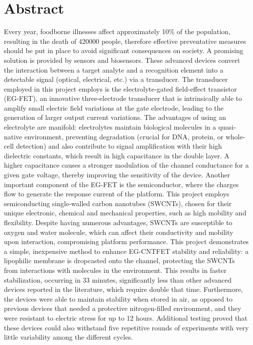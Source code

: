 \chapter*{Abstract}

Every year, foodborne illnesses affect approximately 10\% of the population, resulting in the death of \num{420000} people, therefore effective preventative measures should be put in place to avoid significant consequences on society. A promising solution is provided by sensors and biosensors. These advanced devices convert the interaction between a target analyte and a recognition element into a detectable signal (optical, electrical, etc.) via a transducer. The transducer employed in this project employs is the electrolyte-gated field-effect transistor (EG-FET), an innovative three-electrode transducer that is intrinsically able to amplify small electric field variations at the gate electrode, leading to the generation of larger output current variations. The advantages of using an electrolyte are manifold: electrolytes maintain biological molecules in a quasi-native environment, preventing degradation (crucial for DNA, protein, or whole-cell detection) and also contribute to signal amplification with their high dielectric constants, which result in high capacitance in the double layer. A higher capacitance causes a stronger modulation of the channel conductance for a given gate voltage, thereby improving the sensitivity of the device. Another important component of the EG-FET is the semiconductor, where the charges flow to generate the response current of the platform. This project employs semiconducting single-walled carbon nanotubes (SWCNTs), chosen for their unique electronic, chemical and mechanical properties, such as high mobility and flexibility. Despite having numerous advantages, SWCNTs are susceptible to oxygen and water molecule, which can affect their conductivity and mobility upon interaction, compromising platform performance. This project demonstrates a simple, inexpensive method to enhance EG-CNTFET stability and reliability: a lipophilic membrane is dropcasted onto the channel, protecting the SWCNTs from interactions with molecules in the environment. This results in faster stabilization, occurring in 33 minutes, significantly less than other advanced devices reported in the literature, which require double that time. Furthermore, the devices were able to maintain stability when stored in air, as opposed to previous devices that needed a protective nitrogen-filled environment, and they were resistant to electric stress for up to 12 hours. Additional testing proved that these devices could also withstand five repetitive rounds of experiments with very little variability among the different cycles. 

